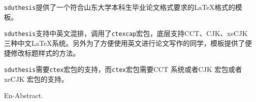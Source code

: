 \begin{cnabstract}
\verb|sduthesis|提供了一个符合山东大学本科生毕业论文格式要求的\LaTeX{}格式的模板。

\verb|sduthesis|支持中英文混排，调用了\verb|ctexcap|宏包，底层支持CCT、CJK、xeCJK三种中文\LaTeX{}系统。另外为了方便使用英文进行论文写作的同学，模板提供了便捷修改标题样式的方法。

\verb|sduthesis|需要\verb|ctex|宏包的支持，而\verb|ctex|宏包需要CCT 系统或者CJK 宏包或者xeCJK 宏包的支持。

\end{cnabstract}

\begin{enabstract}
En-Abstract.

\end{enabstract}